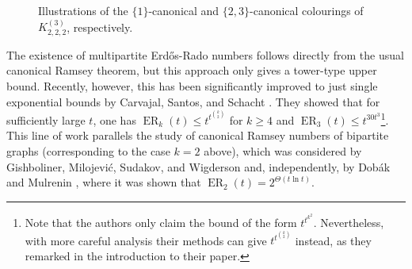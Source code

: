 \documentclass[11pt]{article}
\theoremstyle{plain}
\theoremstyle{definition}
\newcommand{\erado}[2]{\operatorname{ER}_{#1}(#2)}
\newcommand{\tricmplt}[1]{K^{(3)}_{#1,#1,#1}}
\begin{document}
\begin{figure}[ht]
\begin{minipage}{0.3\textwidth}
    \end{minipage}
    \caption{Illustrations of the $\{1\}$-canonical and $\{2,3\}$-canonical colourings of $\tricmplt{2}$, respectively.}
    \label{fig-k222}
\end{figure}

The existence of multipartite Erd\H{o}s-Rado numbers follows directly from the usual canonical Ramsey theorem, but this approach only gives a tower-type upper bound. Recently, however, this has been significantly improved to just single exponential bounds by Carvajal, Santos, and Schacht \cite{carvajal2024canonical}. They showed that for sufficiently large $t$, one has $\erado{k}{t}\le t^{t^{\binom{k}{2}}}$ for $k\ge 4$ and $\erado{3}{t}\le t^{30t^3}$\footnote{Note that the authors only claim the bound of the form $t^{t^{k^2}}$. Nevertheless, with more careful analysis their methods can give $t^{t^{\binom{k}{2}}}$ instead, as they remarked in the introduction to their paper.}. This line of work parallels the study of canonical Ramsey numbers of bipartite graphs (corresponding to the case $k=2$ above), which was considered by Gishboliner, Milojevi\'c, Sudakov, and Wigderson \cite{gishboliner2025canonical} and, independently, by Dob\'ak and Mulrenin \cite{dobak2026sharp}, where it was shown that $\erado{2}{t}=2^{\Theta(t\ln t)}$.
\end{document}
